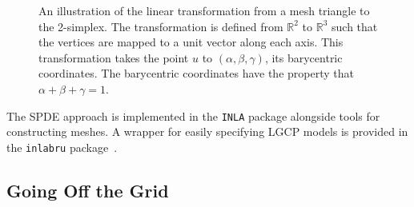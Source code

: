\documentclass[]{interact}
\begin{document}
\begin{figure}[h]\centering

\hspace{2em}

\caption{An illustration of the linear transformation from a mesh triangle to
the 2-simplex. The transformation is defined from \(\mathbb{R}^{2}\) to
\(\mathbb{R}^{3}\) such that the vertices are mapped to a unit vector along
each axis. This transformation takes the point \(u\) to
\((\alpha, \beta, \gamma)\), its barycentric coordinates. The barycentric
coordinates have the property that \(\alpha + \beta + \gamma = 1\).}
\label{triangle}
\end{figure}

The SPDE approach is implemented in the \texttt{INLA} package alongside tools
for constructing meshes. A wrapper for easily specifying LGCP models is
provided in the \texttt{inlabru} package~\cite{inlabru}.


\subsection{Going Off the Grid}
\label{offgrid}
\end{document}
